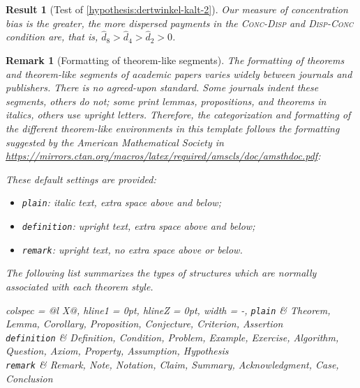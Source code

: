 \documentclass[11pt, a4paper, oneside]{article}
\newlength{\baselinedist}
\newlength{\smalllinespacing}
\renewenvironment{quotation}{%
	\list{}{%
		\baselineskip = \smalllinespacing%
		\leftmargin = \baselineskip%
		\rightmargin = \leftmargin%
		\listparindent = \smalllinespacing%
		\parsep = 0pt%
		\topsep = 0.5\baselinedist plus 3ex
	}%
	\item\relax%
}{%
	\endlist%
}
\theoremstyle{Plain}
\theoremstyle{Definition}
\newtheorem{result}{Resultat}
\newtheorem{result}{Result}
\theoremstyle{Remark}
\newtheorem{remark}{Anmerkung}
\newtheorem{remark}{Remark}
\begin{document}
\begin{result}[Test of \autoref{hypothesis:dertwinkel-kalt-2}]
	\label{result:dertwinkel-kalt-2}
	Our measure of concentration bias is the greater, the more dispersed payments in the \textsc{Conc-Disp} and \textsc{Disp-Conc} condition are, that is, ${\hat{d}_8 > \hat{d}_4 > \hat{d}_2 > 0}$.
\end{result}

\begin{remark}[Formatting of theorem-like segments]
	\label{remark:formatting}
	The formatting of theorems and theorem-like segments of academic papers varies widely between journals and publishers. There is no agreed-upon standard. Some journals indent these segments, others do not; some print lemmas, propositions, and theorems in italics, others use upright letters. Therefore, the categorization and formatting of the different theorem-like environments in this template follows the formatting suggested by the American Mathematical Society in \url{https://mirrors.ctan.org/macros/latex/required/amscls/doc/amsthdoc.pdf}: \par
	\begin{quotation}
		These default settings are provided: \par\vskip7.5pt
		\begin{itemize}[leftmargin = \baselinedist, labelsep = 0.45\baselinedist]
			\item \texttt{plain}: italic text, extra space above and below;
			\item \texttt{definition}: upright text, extra space above and below;
			\item \texttt{remark}: upright text, no extra space above or below.
		\end{itemize} \par\vskip7.5pt
		\textellipsis \par
		The following list summarizes the types of structures which are normally
		associated with each theorem style. \par\vskip7.5pt
		\begin{tblr}{
			colspec = {@{}l X@{}},
			hline{1} = {0pt},
			hline{Z} = {0pt},
			width = \linewidth-\parindent,
		}
			\texttt{plain} &
			Theorem, Lemma, Corollary, Proposition, Conjecture, Criterion, Assertion
			\\
			\texttt{definition} &
			Definition, Condition, Problem, Example, Exercise, Algorithm, Question, Axiom, Property, Assumption, Hypothesis
			\\
			\texttt{remark} &
			Remark, Note, Notation, Claim, Summary, Acknowledgment, Case, Conclusion
		\end{tblr}
	\end{quotation}
\end{remark}
\end{document}
